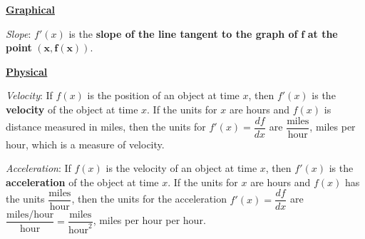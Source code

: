 \noindent\textbf{\underline{Graphical}}
\begin{justify}
\emph{Slope}: $f'(x)$ is the \textbf{slope of the line tangent to the graph of} $\bm{f}$ \textbf{at the point} $\bm{(x,f(x))}.$\\
\end{justify}

\noindent\textbf{\underline{Physical}}
\begin{justify}
\emph{Velocity}: If $f(x)$ is the position of an object at time $x$, then $f'(x)$ is the \textbf{velocity} of the object at time $x$. If the units for $x$ are hours and $f(x)$ is distance measured in miles, then the units for $f'(x)=\dfrac{df}{dx}$ are $\dfrac{\text{miles}}{\text{hour}}$, miles per hour, which is a measure of velocity.\\
\end{justify}

\begin{justify}
\emph{Acceleration}: If $f(x)$ is the velocity of an object at time $x$, then $f'(x)$ is the \textbf{acceleration} of the object at time $x$. If the units for $x$ are hours and $f(x)$ has the units $\dfrac{\text{miles}}{\text{hour}}$, then the units for the acceleration $f'(x)=\dfrac{df}{dx}$ are $\dfrac{\text{miles/hour}}{\text{hour}}=\dfrac{\text{miles}}{\text{hour}^2}$, miles per hour per hour.\\
\end{justify}

